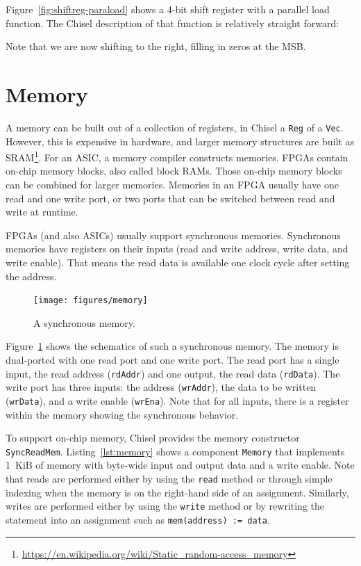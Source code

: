 \documentclass[%
    10pt,
    headinclude, footexclude,
    openright, %
    notitlepage,
    cleardoubleempty,
    headsepline,
    pointlessnumbers,
    bibtotoc, idxtotoc,
    ]{scrbook}
\newcommand{\code}[1]{{\small{\texttt{#1}}}}
\newcommand{\myref}[2]{\href{#1}{#2}}
\renewcommand{\myref}[2]{{#2}{\footnote{\url{#1}}}}
\begin{document}
Figure~\ref{fig:shiftreg-paraload} shows a 4-bit shift register with a parallel load function.
The Chisel description of that function is relatively straight forward:


Note that we are now shifting to the right, filling in zeros at the MSB.

\section{Memory}

A memory can be built out of a collection of registers, in Chisel a \code{Reg} of a \code{Vec}.
However, this is expensive in hardware, and larger memory structures are built
as \myref{https://en.wikipedia.org/wiki/Static_random-access_memory}{SRAM}.
For an ASIC, a memory compiler constructs memories.
FPGAs contain on-chip memory blocks, also called block RAMs.
Those on-chip memory blocks can be combined for larger memories.
Memories in an FPGA usually have one read and one write port, or
two ports that can be switched between read and write at runtime.

FPGAs (and also ASICs) usually support synchronous memories.
Synchronous memories have registers on their inputs (read and write address, write data,
and write enable). That means the read data is available one clock
cycle after setting the address.

\begin{figure}
  \centering
  \texttt{[image: figures/memory]}
  \caption{A synchronous memory.}
  \label{fig:memory}
\end{figure}

Figure~\ref{fig:memory} shows the schematics of such a synchronous memory.
The memory is dual-ported with one read port and one write port.
The read port has a single input, the read address (\code{rdAddr}) and
one output, the read data (\code{rdData}).
The write port has three inputs: the address (\code{wrAddr}), the data
to be written (\code{wrData}), and a write enable (\code{wrEna}).
Note that for all inputs, there is a register within the memory showing the
synchronous behavior.

To support on-chip memory, Chisel provides the memory constructor \code{SyncReadMem}.
Listing~\ref{lst:memory} shows a component \code{Memory} that implements
1~KiB of memory with byte-wide input and output data and a write enable. 
Note that reads are performed either by using the \code{read} method or through 
simple indexing when the memory is on the right-hand side of an assignment. 
Similarly, writes are performed either by using the \code{write} method or by 
rewriting the statement into an assignment such as \code{mem(address) := data}.
\end{document}
